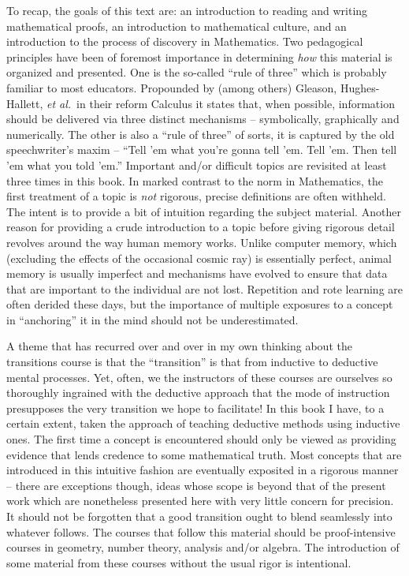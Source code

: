 To recap, the goals of this text are: an introduction to reading and
writing mathematical proofs, an introduction to mathematical culture,
and an introduction to the process of discovery in Mathematics.  Two
pedagogical principles have been of foremost importance in determining
{\em how} this material is organized and presented.  One is the
so-called ``rule of three'' which is probably familiar to most
educators.  Propounded by (among others) Gleason, Hughes-Hallett, {\em et al.}\ in their
reform Calculus it states that, when possible, information should be
delivered via three distinct mechanisms -- symbolically, graphically and
numerically.  The other is also a ``rule of three'' of sorts, it is captured by
the old speechwriter's maxim -- ``Tell 'em what you're gonna tell 'em.
Tell 'em.  Then tell 'em what you told 'em.''  Important and/or difficult
topics are revisited at least three times in this book.  In marked contrast to
the norm in Mathematics, the first treatment of a topic is {\em not}
rigorous, precise definitions are often withheld.  The intent is to
provide a bit of intuition regarding the subject material.  Another
reason for providing a crude introduction to a topic before giving
rigorous detail revolves around the way human memory works.  Unlike
computer memory, which (excluding the effects of the occasional
cosmic ray) is essentially perfect, animal memory is usually imperfect
and mechanisms have evolved to ensure that data that are important to
the individual are not lost.  Repetition and rote learning are often
derided these days, but the importance of multiple exposures to a
concept in ``anchoring'' it in the mind should not be underestimated. 

A theme that has recurred over and over in my own thinking about
the transitions course is that the ``transition'' is that from inductive
to deductive mental processes.  Yet, often, we the instructors of these courses
are ourselves so thoroughly ingrained with the deductive approach
that the mode of instruction presupposes the very transition we 
hope to facilitate!  In this book I have, to a certain extent, 
taken the approach of
teaching deductive methods using inductive ones.  The first 
time a concept is encountered should only be viewed as providing
evidence that lends credence to some mathematical truth.  Most 
concepts that are introduced in this intuitive fashion are eventually
exposited in a rigorous manner -- there are exceptions though, ideas
whose scope is beyond that of the present work which are nonetheless
presented here with very little concern for precision.  It should
not be forgotten that a good transition ought to blend seamlessly 
into whatever follows.  The courses that follow this material 
should be proof-intensive courses in geometry, number theory, 
analysis and/or algebra.
The introduction of some material from these courses without the
usual rigor is intentional. 


